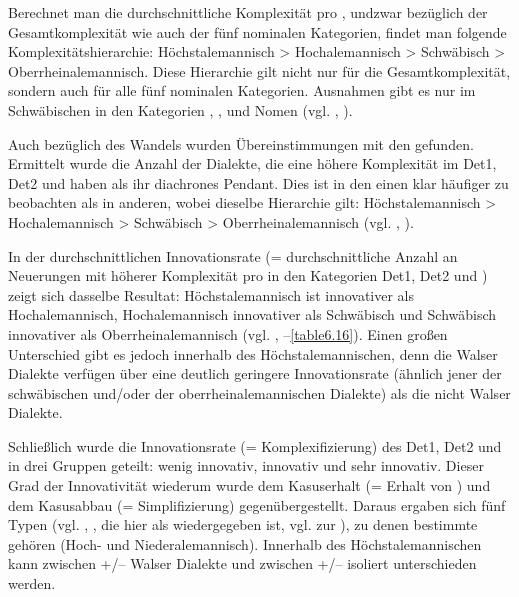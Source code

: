Berechnet man die durchschnittliche Komplexität pro , und\linebreak zwar bezüglich der Gesamtkomplexität wie auch der fünf nominalen Kategorien, findet man folgende Komplexitätshierarchie: Höchstalemannisch > Hochalemannisch > Schwäbisch > Oberrheinalemannisch. Diese Hierarchie gilt nicht nur für die Gesamtkomplexität, sondern auch für alle fünf nominalen Kategorien. Ausnahmen gibt es nur im Schwäbischen in den Kategorien , ,  und Nomen (vgl. , ).

Auch bezüglich des Wandels wurden Übereinstimmungen mit den  gefunden. Ermittelt wurde die Anzahl der Dialekte, die eine höhere Komplexität im Det1, Det2 und  haben als ihr diachrones Pendant. Dies ist in den einen  klar häufiger zu beobachten als in anderen, wobei dieselbe Hierarchie gilt: Höchstalemannisch > Hochalemannisch > Schwäbisch > Oberrheinalemannisch (vgl. , ).

In der durchschnittlichen Innovationsrate (= durchschnittliche Anzahl an Neuerungen mit höherer Komplexität pro  in den Kategorien Det1, Det2 und ) zeigt sich dasselbe Resultat: Höchstalemannisch ist innovativer als Hochalemannisch, Hochalemannisch innovativer als Schwäbisch und Schwäbisch innovativer als Oberrheinalemannisch (vgl. , –\ref{table6.16}). Einen großen Unterschied gibt es jedoch innerhalb des Höchstalemannischen, denn die Walser Dialekte verfügen über eine deutlich geringere Innovationsrate (ähnlich jener der schwäbischen und/oder der oberrheinalemannischen Dialekte) als die nicht Walser Dialekte.

Schließlich wurde die Innovationsrate (= Komplexifizierung) des Det1, Det2 und  in drei Gruppen geteilt: wenig innovativ, innovativ und sehr innovativ. Dieser Grad der Innovativität wiederum wurde dem Kasuserhalt (= Erhalt von ) und dem Kasusabbau (= Simplifizierung) gegenübergestellt. Daraus ergaben sich fünf Typen (vgl. , , die hier als  wiedergegeben ist, vgl.  zur ), zu denen bestimmte  gehören (Hoch- und Niederalemannisch). Innerhalb des Höchstalemannischen kann zwischen +/– Walser Dialekte und zwischen +/– isoliert unterschieden werden.

